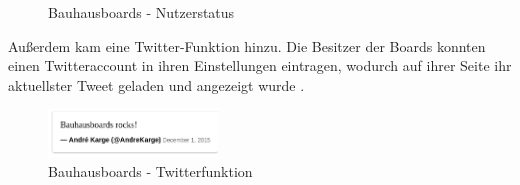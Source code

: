 \begin{figure}
  \centering
  \caption{Bauhausboards - Nutzerstatus}
  \label{img:UserAvailable}
\end{figure}
Außerdem kam eine Twitter-Funktion hinzu. Die Besitzer der Boards konnten einen Twitteraccount in ihren Einstellungen eintragen, wodurch auf ihrer Seite ihr aktuellster Tweet geladen und angezeigt wurde . 
\begin{figure}
  \centering
    \includegraphics[width=0.4\textwidth]{./img/TwitterFeature.png}
  \caption{Bauhausboards - Twitterfunktion}
  \label{img:twitter}
\end{figure}


